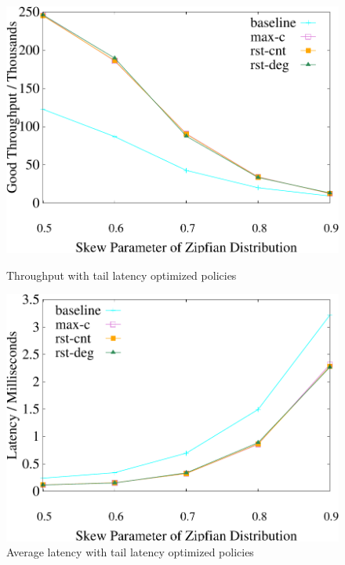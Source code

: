 \begin{figure}[t]
    \centering
	\begin{minipage}[b]{0.32\linewidth}
	\centering
	\includegraphics[width=\textwidth]{./exp_fig/restart/tps}
	\vspace{-2em}
	\caption{Throughput with tail latency optimized policies}
	\label{fig:restart:tps}
	\end{minipage}
    \begin{minipage}[b]{0.32\linewidth}
	\centering
	\includegraphics[width=\textwidth]{./exp_fig/restart/latency}
	\vspace{-2em}
	\caption{Average latency with tail latency optimized policies}
	\label{fig:restart:abort}
	\end{minipage}

\end{figure}
